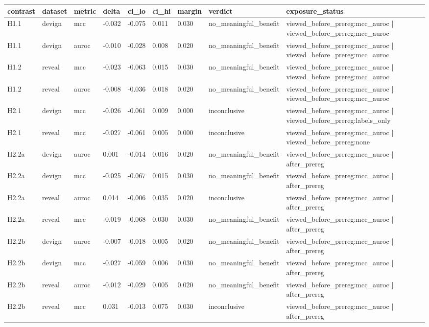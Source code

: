 \begin{tabular}{lllllllll}
\toprule
contrast & dataset & metric & delta & ci\_lo & ci\_hi & margin & verdict & exposure\_status \\
\midrule
H1.1 & devign & mcc & -0.032 & -0.075 & 0.011 & 0.030 & no\_meaningful\_benefit & viewed\_before\_prereg:mcc\_auroc | viewed\_before\_prereg:mcc\_auroc \\
H1.1 & devign & auroc & -0.010 & -0.028 & 0.008 & 0.020 & no\_meaningful\_benefit & viewed\_before\_prereg:mcc\_auroc | viewed\_before\_prereg:mcc\_auroc \\
H1.2 & reveal & mcc & -0.023 & -0.063 & 0.015 & 0.030 & no\_meaningful\_benefit & viewed\_before\_prereg:mcc\_auroc | viewed\_before\_prereg:mcc\_auroc \\
H1.2 & reveal & auroc & -0.008 & -0.036 & 0.018 & 0.020 & no\_meaningful\_benefit & viewed\_before\_prereg:mcc\_auroc | viewed\_before\_prereg:mcc\_auroc \\
H2.1 & devign & mcc & -0.026 & -0.061 & 0.009 & 0.000 & inconclusive & viewed\_before\_prereg:mcc\_auroc | viewed\_before\_prereg:labels\_only \\
H2.1 & reveal & mcc & -0.027 & -0.061 & 0.005 & 0.000 & inconclusive & viewed\_before\_prereg:mcc\_auroc | viewed\_before\_prereg:none \\
H2.2a & devign & auroc & 0.001 & -0.014 & 0.016 & 0.020 & no\_meaningful\_benefit & viewed\_before\_prereg:mcc\_auroc | after\_prereg \\
H2.2a & devign & mcc & -0.025 & -0.067 & 0.015 & 0.030 & no\_meaningful\_benefit & viewed\_before\_prereg:mcc\_auroc | after\_prereg \\
H2.2a & reveal & auroc & 0.014 & -0.006 & 0.035 & 0.020 & inconclusive & viewed\_before\_prereg:mcc\_auroc | after\_prereg \\
H2.2a & reveal & mcc & -0.019 & -0.068 & 0.030 & 0.030 & no\_meaningful\_benefit & viewed\_before\_prereg:mcc\_auroc | after\_prereg \\
H2.2b & devign & auroc & -0.007 & -0.018 & 0.005 & 0.020 & no\_meaningful\_benefit & viewed\_before\_prereg:mcc\_auroc | after\_prereg \\
H2.2b & devign & mcc & -0.027 & -0.059 & 0.006 & 0.030 & no\_meaningful\_benefit & viewed\_before\_prereg:mcc\_auroc | after\_prereg \\
H2.2b & reveal & auroc & -0.012 & -0.029 & 0.005 & 0.020 & no\_meaningful\_benefit & viewed\_before\_prereg:mcc\_auroc | after\_prereg \\
H2.2b & reveal & mcc & 0.031 & -0.013 & 0.075 & 0.030 & inconclusive & viewed\_before\_prereg:mcc\_auroc | after\_prereg \\

\end{tabular}
